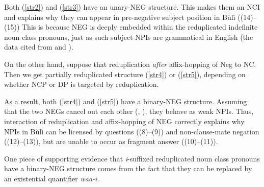 \documentclass[output=paper,colorlinks,citecolor=brown]{langscibook}
\begin{document}
Both (\ref{str2}) and (\ref{str3}) have an unary-NEG structure. This makes them an NCI and explains why they can appear in pre-negative subject position in Bùlì ((14)--(15)) This is because NEG is deeply embedded within the reduplicated indefinite noun class pronouns, just as such subject NPIs are grammatical in English (the data cited from \citealt[362]{Boeckx2000} and \citealt[179]{Boskovic2002AMove}).
\ea
{}
\z
\z

On the other hand, suppose that reduplication \textit{after} affix-hopping of Neg to NC. Then we get  partially reduplicated structure (\ref{str4}) or (\ref{str5}), depending on whether NCP or DP is targeted by reduplication.

 \label{str4}
\z

\ea[] {[[$_{\textup{DP}}$  wāā-NEG -\={i}] [$_{\textup{NegP}}$ NEG wāā -\={i}]]} \label{str5}
\z

As a result, both (\ref{str4}) and (\ref{str5}) have a binary-NEG structure. Assuming that the two NEGs cancel out each other (\citealt{CollinsEtAl2017}, \citealt{Watanabe2004}),  they behave as weak NPIs. Thus, interaction of reduplication and affix-hopping of NEG correctly explains why NPIs in Bùlì can be licensed by questions ((8)--(9)) and non-clause-mate negation ((12)--(13)), but are unable to occur as fragment answer ((10)--(11)).

One piece of supporting evidence that \textit{i}-suffixed reduplicated noun class pronouns have a binary-NEG structure comes from the fact that they can be replaced by an existential quantifier \textit{waa-i}.


\z

\z
\end{document}
